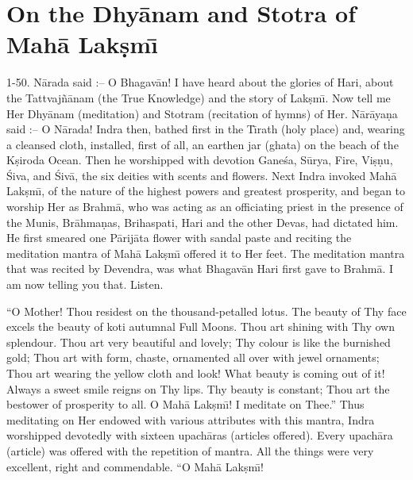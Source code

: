 \chapter{On the Dhy\=anam and Stotra of Mah\=a Lak\d{s}m\={\i}}

1-50. N\=arada said :-- O Bhagav\=an! I have heard about the glories of Hari, about the Tattvaj\~n\=anam (the True Knowledge) and the story of Lak\d{s}m\={\i}. Now tell me Her Dhy\=anam (meditation) and Stotram (recitation of hymns) of Her. N\=ar\=aya\d{n}a said :-- O N\=arada! Indra then, bathed first in the T\={\i}rath (holy place) and, wearing a cleansed cloth, installed, first of all, an earthen jar (ghata) on the beach of the K\d{s}iroda Ocean. Then he worshipped with devotion Gane\'sa, S\=urya, Fire, Vi\d{s}\d{n}u, \'Siva, and \'Siv\=a, the six deities with scents and flowers. Next Indra invoked Mah\=a Lak\d{s}m\={\i}, of the nature of the highest powers and greatest prosperity, and began to worship Her as Brahm\=a, who was acting as an officiating priest in the presence of the Munis, Br\=ahma\d{n}as, Brihaspati, Hari and the other Devas, had dictated him. He first smeared one P\=arij\=ata flower with sandal paste and reciting the meditation mantra of Mah\=a Lak\d{s}m\={\i} offered it to Her feet. The meditation mantra that was recited by Devendra, was what Bhagav\=an Hari first gave to Brahm\=a. I am now telling you that. Listen.

``O Mother! Thou residest on the thousand-petalled lotus. The beauty of Thy face excels the beauty of koti autumnal Full Moons. Thou art shining with Thy own splendour. Thou art very beautiful and lovely; Thy colour is like the burnished gold; Thou art with form, chaste, ornamented all over with jewel ornaments; Thou art wearing the yellow cloth and look! What beauty is coming out of it! Always a sweet smile reigns on Thy lips. Thy beauty is constant; Thou art the bestower of prosperity to all. O Mah\=a Lak\d{s}m\={\i}! I meditate on Thee.'' Thus meditating on Her endowed with various attributes with this mantra, Indra worshipped devotedly with sixteen upach\=aras (articles offered). Every upach\=ara (article) was offered with the repetition of mantra. All the things were very excellent, right and commendable. ``O Mah\=a Lak\d{s}m\={\i}!

